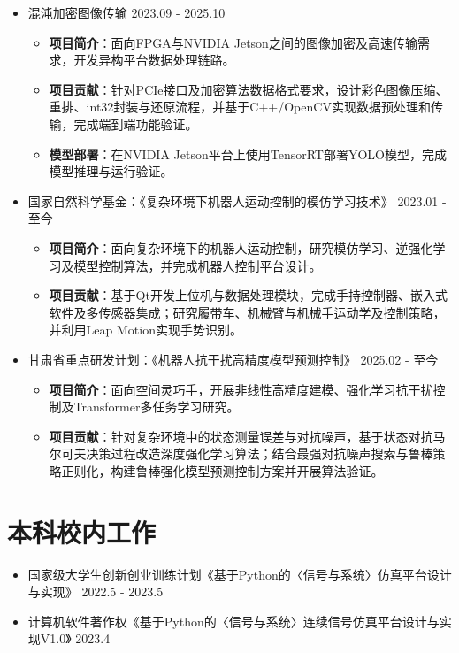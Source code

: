 \documentclass{logo-cv}
\begin{document}
\begin{itemize}
    \item 混沌加密图像传输 \hfill 2023.09 - 2025.10
    \begin{itemize}
        \item \textbf{项目简介}：面向FPGA与NVIDIA Jetson之间的图像加密及高速传输需求，开发异构平台数据处理链路。
        \item \textbf{项目贡献}：针对PCIe接口及加密算法数据格式要求，设计彩色图像压缩、重排、int32封装与还原流程，并基于C++/OpenCV实现数据预处理和传输，完成端到端功能验证。
        \item \textbf{模型部署}：在NVIDIA Jetson平台上使用TensorRT部署YOLO模型，完成模型推理与运行验证。
    \end{itemize}
    \item 国家自然科学基金：《复杂环境下机器人运动控制的模仿学习技术》 \hfill 2023.01 - 至今
    \begin{itemize}
        \item \textbf{项目简介}：面向复杂环境下的机器人运动控制，研究模仿学习、逆强化学习及模型控制算法，并完成机器人控制平台设计。
        \item \textbf{项目贡献}：基于Qt开发上位机与数据处理模块，完成手持控制器、嵌入式软件及多传感器集成；研究履带车、机械臂与机械手运动学及控制策略，并利用Leap Motion实现手势识别。
    \end{itemize}
    \item 甘肃省重点研发计划：《机器人抗干扰高精度模型预测控制》 \hfill 2025.02 - 至今
    \begin{itemize}
        \item \textbf{项目简介}：面向空间灵巧手，开展非线性高精度建模、强化学习抗干扰控制及Transformer多任务学习研究。
        \item \textbf{项目贡献}：针对复杂环境中的状态测量误差与对抗噪声，基于状态对抗马尔可夫决策过程改造深度强化学习算法；结合最强对抗噪声搜索与鲁棒策略正则化，构建鲁棒强化模型预测控制方案并开展算法验证。
    \end{itemize}
\end{itemize}

\section{本科校内工作}
\begin{itemize}
    \item 国家级大学生创新创业训练计划《基于Python的〈信号与系统〉仿真平台设计与实现》 \hfill 2022.5 - 2023.5
    \item 计算机软件著作权《基于Python的〈信号与系统〉连续信号仿真平台设计与实现V1.0》 \hfill 2023.4
\end{itemize}
\end{document}

